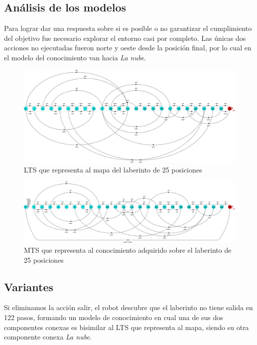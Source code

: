 \clearpage

\subsection{Análisis de los modelos}

Para lograr dar una respuesta sobre si es posible o no garantizar el cumplimiento del objetivo fue necesario
explorar el entorno casi por completo. Las únicas dos acciones no ejecutadas fueron norte y oeste desde la posición
final, por lo cual en el modelo del conocimiento van hacia \textit{La nube}.

\begin{figure}[H]
	\centering
		\includegraphics[width=1.0\textwidth]{Imagenes/Laberintos/25_view.jpg}
	\caption{LTS que representa al mapa del laberinto de 25 posiciones}
	\label{fig:25_view}
\end{figure}

\begin{figure}[H]
	\centering
		\includegraphics[width=1.0\textwidth]{Imagenes/Laberintos/25_knowledge.jpg}
	\caption{MTS que representa al conocimiento adquirido sobre el laberinto de 25 posiciones}
	\label{fig:25_knowledge}
\end{figure}

\clearpage

\subsection{Variantes}

Si eliminamos la acción salir, el robot descubre que el laberinto no tiene salida en 122 pasos, formando un modelo
de conocimiento en cual una de sus dos componentes conexas es bisimilar al LTS que representa al mapa, siendo su
otra componente conexa \textit{La nube}.

